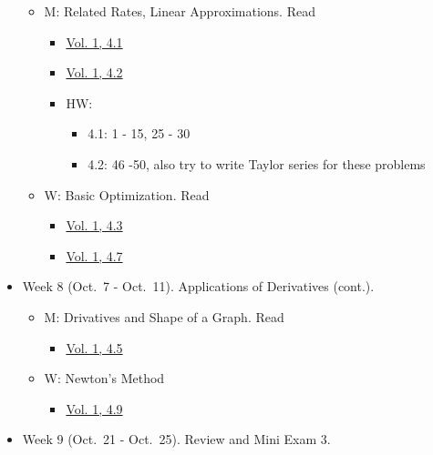 \documentclass[
]{article}
\providecommand{\tightlist}{%
  \setlength{\itemsep}{0pt}\setlength{\parskip}{0pt}}
\begin{document}
\begin{itemize}
  \begin{itemize}
  \tightlist
  \item
    M: Related Rates, Linear Approximations. Read

    \begin{itemize}
    \tightlist
    \item
      \href{https://openstax.org/books/calculus-volume-1/pages/4-1-related-rates}{Vol. 1, 4.1}
    \item
      \href{https://openstax.org/books/calculus-volume-1/pages/4-2-linear-approximations-and-differentials}{Vol. 1, 4.2}
    \item
      HW:

      \begin{itemize}
      \tightlist
      \item
        4.1: 1 - 15, 25 - 30
      \item
        4.2: 46 -50, also try to write Taylor series for these problems
      \end{itemize}
    \end{itemize}
  \item
    W: Basic Optimization. Read

    \begin{itemize}
    \tightlist
    \item
      \href{https://openstax.org/books/calculus-volume-1/pages/4-3-maxima-and-minima}{Vol. 1, 4.3}
    \item
      \href{https://openstax.org/books/calculus-volume-1/pages/4-7-applied-optimization-problems}{Vol. 1, 4.7}
    \end{itemize}
  \end{itemize}
\item
  Week 8 (Oct.~7 - Oct.~11). Applications of Derivatives (cont.).

  \begin{itemize}
  \tightlist
  \item
    M: Drivatives and Shape of a Graph. Read

    \begin{itemize}
    \tightlist
    \item
      \href{https://openstax.org/books/calculus-volume-1/pages/4-5-derivatives-and-the-shape-of-a-graph}{Vol. 1, 4.5}
    \end{itemize}
  \item
    W: Newton's Method

    \begin{itemize}
    \tightlist
    \item
      \href{https://openstax.org/books/calculus-volume-1/pages/4-9-newtons-method}{Vol. 1, 4.9}
    \end{itemize}
  \end{itemize}
\item
  Week 9 (Oct.~21 - Oct.~25). Review and Mini Exam 3.


\end{itemize}
\end{document}
